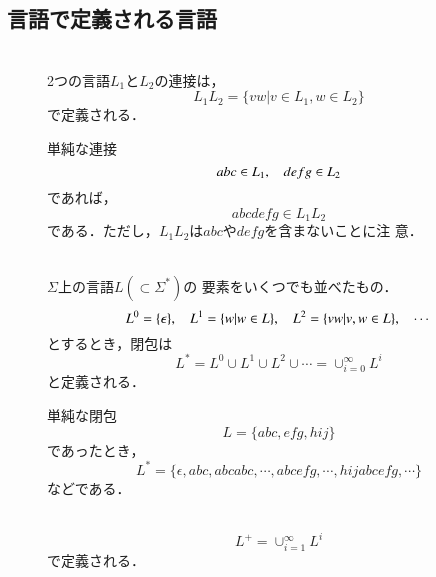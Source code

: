 \subsection{言語で定義される言語}
\begin{description}
 \item [] \mbox{} \\
 2つの言語$L_1$と$L_2$の連接は，
            \[
             L_1 L_2 = \{vw | v \in L_1 , w \in L_2\}
            \]
            で定義される．
            \begin{myexample}{単純な連接}
             \[
              abc \in L_1 , \hspace{2ex} defg \in L_2
             \]
             であれば，
             \[
              abcdefg \in L_1 L_2
             \]
             である．ただし，$L_1 L_2$は$abc$や$defg$を含まないことに注
             意．
            \end{myexample}
            
 \item [] \mbox{} \\
 $\Sigma$上の言語$L (\subset \Sigma^*) $の
            要素をいくつでも並べたもの．
            \[
             L^0 = \{\epsilon\}, \hspace{2ex} L^1 = \{w | w \in L\}, \hspace{2ex} L^2 = \{vw
            | v, w \in L\}, \hspace{2ex} \cdots 
            \]
            とするとき，閉包は
            \[
             L^* = L^0 \cup L^1 \cup L^2 \cup \cdots = \cup^{\infty}_{i
            = 0} L^i
            \]
            と定義される．
            \begin{myexample}{単純な閉包}
             \[
             L = \{abc, efg, hij\}
             \]
             であったとき，
             \[
              L^* = \{\epsilon, abc, abcabc, \cdots, abcefg, \cdots,
             hijabcefg, \cdots\}
             \]
             などである．
            \end{myexample}
            
 \item [] \mbox{} \\
            \[
             L^+ = \cup^{\infty}_{i = 1} L^i
            \]
            で定義される．
\end{description}

